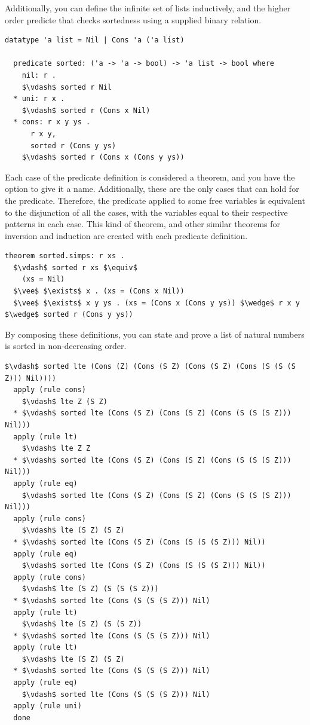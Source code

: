 \documentclass[letterpaper, 11pt]{extarticle}
\begin{document}
Additionally, you can define the infinite set of lists inductively, and the higher order predicte that checks
sortedness using a supplied binary relation.

\begin{lstlisting}[language=logic]
  datatype 'a list = Nil | Cons 'a ('a list)
  
  predicate sorted: ('a -> 'a -> bool) -> 'a list -> bool where
    nil: r . 
    $\vdash$ sorted r Nil
  * uni: r x . 
    $\vdash$ sorted r (Cons x Nil)
  * cons: r x y ys .
      r x y,
      sorted r (Cons y ys)
    $\vdash$ sorted r (Cons x (Cons y ys))
\end{lstlisting}

Each case of the predicate definition is considered a theorem, and you have the option to give it a name. 
Additionally, these are the only cases that can hold for the predicate. Therefore, the predicate applied to some free
variables is equivalent to the disjunction of all the cases, with the variables equal to their respective patterns
in each case. This kind of theorem, and other similar theorems for inversion and induction
are created with each predicate definition.

\begin{lstlisting}[language=logic]
  theorem sorted.simps: r xs .
  $\vdash$ sorted r xs $\equiv$
    (xs = Nil)
  $\vee$ $\exists$ x . (xs = (Cons x Nil))
  $\vee$ $\exists$ x y ys . (xs = (Cons x (Cons y ys)) $\wedge$ r x y $\wedge$ sorted r (Cons y ys))
\end{lstlisting}

By composing these definitions, you can state and prove a list of natural numbers is sorted in non-decreasing order.

\begin{lstlisting}[language=logic]
  $\vdash$ sorted lte (Cons (Z) (Cons (S Z) (Cons (S Z) (Cons (S (S (S Z))) Nil))))
  apply (rule cons)
    $\vdash$ lte Z (S Z)
  * $\vdash$ sorted lte (Cons (S Z) (Cons (S Z) (Cons (S (S (S Z))) Nil)))
  apply (rule lt)
    $\vdash$ lte Z Z
  * $\vdash$ sorted lte (Cons (S Z) (Cons (S Z) (Cons (S (S (S Z))) Nil)))
  apply (rule eq)
    $\vdash$ sorted lte (Cons (S Z) (Cons (S Z) (Cons (S (S (S Z))) Nil)))
  apply (rule cons)
    $\vdash$ lte (S Z) (S Z)
  * $\vdash$ sorted lte (Cons (S Z) (Cons (S (S (S Z))) Nil))
  apply (rule eq)
    $\vdash$ sorted lte (Cons (S Z) (Cons (S (S (S Z))) Nil))
  apply (rule cons)
    $\vdash$ lte (S Z) (S (S (S Z)))
  * $\vdash$ sorted lte (Cons (S (S (S Z))) Nil)
  apply (rule lt)
    $\vdash$ lte (S Z) (S (S Z))
  * $\vdash$ sorted lte (Cons (S (S (S Z))) Nil)
  apply (rule lt)
    $\vdash$ lte (S Z) (S Z)
  * $\vdash$ sorted lte (Cons (S (S (S Z))) Nil)
  apply (rule eq)
    $\vdash$ sorted lte (Cons (S (S (S Z))) Nil)
  apply (rule uni)
  done
\end{lstlisting}
\end{document}
